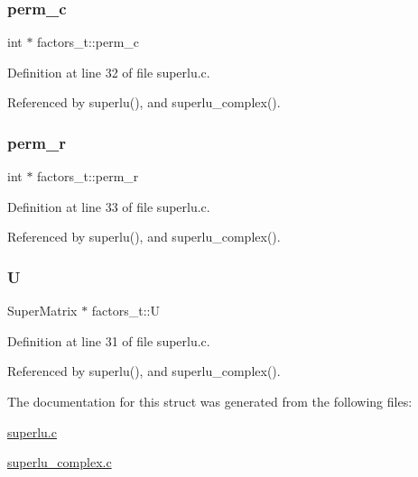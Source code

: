 \subsubsection{\texorpdfstring{perm\+\_\+c}{perm\_c}}
{\footnotesize\ttfamily int $\ast$ factors\+\_\+t\+::perm\+\_\+c}



Definition at line 32 of file superlu.\+c.



Referenced by superlu(), and superlu\+\_\+complex().

\mbox{\label{structfactors__t_af0016e789d7a575ffc8945a23b3b812a}} 
\subsubsection{\texorpdfstring{perm\+\_\+r}{perm\_r}}
{\footnotesize\ttfamily int $\ast$ factors\+\_\+t\+::perm\+\_\+r}



Definition at line 33 of file superlu.\+c.



Referenced by superlu(), and superlu\+\_\+complex().

\mbox{\label{structfactors__t_a336bf3fd72304c337b78e71607de7d1e}} 
\subsubsection{\texorpdfstring{U}{U}}
{\footnotesize\ttfamily Super\+Matrix $\ast$ factors\+\_\+t\+::U}



Definition at line 31 of file superlu.\+c.



Referenced by superlu(), and superlu\+\_\+complex().



The documentation for this struct was generated from the following files\+:\begin{DoxyCompactItemize}
\item 
\hyperlink{superlu_8c}{superlu.\+c}\item 
\hyperlink{superlu__complex_8c}{superlu\+\_\+complex.\+c}\end{DoxyCompactItemize}
